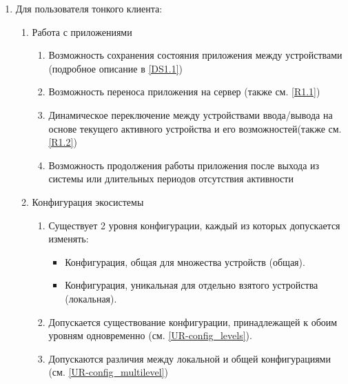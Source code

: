 \begin{enumerate}[label={\bfseries ПТ-\arabic*}]
   \item Для пользователя тонкого клиента:
         \begin{enumerate}[label*={\bfseries.\arabic*}]
            \item Работа с приложениями
                  \begin{enumerate}[label*={\bfseries.\arabic*}]
                     \item Возможность сохранения состояния приложения между устройствами (подробное описание в \ref{DS1.1}) %
                     \item Возможность переноса приложения на сервер (также см. \ref{R1.1}) %
                     \item Динамическое переключение между устройствами ввода/вывода на основе текущего активного устройства и его возможностей(также см. \ref{R1.2}) %
                     \item Возможность продолжения работы приложения после выхода из системы или длительных периодов отсутствия активности
                  \end{enumerate}
            \item Конфигурация экосистемы
                  \begin{enumerate}[label*={\bfseries.\arabic*}]
                     \item Существует 2 уровня конфигурации, каждый из которых допускается изменять:
                           \begin{itemize}
                              \item Конфигурация, общая для множества устройств (общая).
                              \item Конфигурация, уникальная для отдельно взятого устройства (локальная).
                                    \label{UR-config_levels}
                           \end{itemize}
                     \item Допускается существование конфигурации, принадлежащей к обоим уровням одновременно (см. \ref{UR-config_levels}).
                           \label{UR-config_multilevel}
                     \item Допускаются различия между локальной и общей конфигурациями (см. \ref{UR-config_multilevel})

\end{enumerate}
\end{enumerate}
\end{enumerate}
